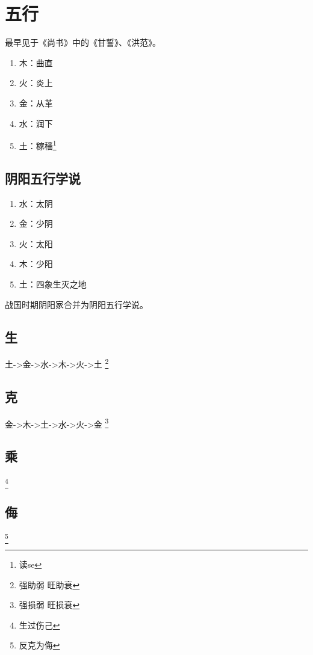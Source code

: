 \section{五行}
最早见于《尚书》中的《甘誓》、《洪范》。
\begin{enumerate}
  \item 木：曲直
  \item 火：炎上
  \item 金：从革
  \item 水：润下
  \item 土：稼穑\footnote{读se}
\end{enumerate}
\subsection{阴阳五行学说}
\begin{enumerate}
  \item 水：太阴
  \item 金：少阴
  \item 火：太阳
  \item 木：少阳
  \item 土：四象生灭之地
\end{enumerate}
战国时期阴阳家合并为阴阳五行学说。
\subsection{生}
 土->金->水->木->火->土
\footnote{强助弱 旺助衰}
\subsection{克}
金->木->土->水->火->金
\footnote{强损弱 旺损衰 }
\subsection{乘}
\footnote{生过伤己}
\subsection{侮}
\footnote{反克为侮}
